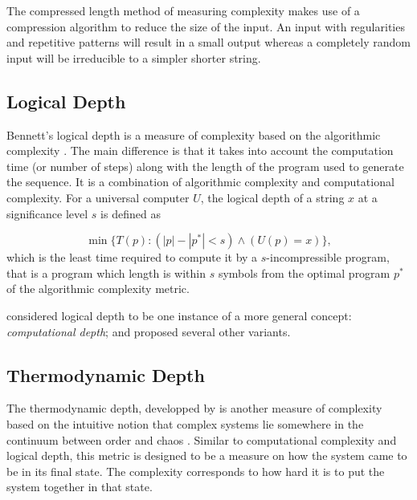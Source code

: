 The compressed length method of measuring complexity makes use of a compression
algorithm to reduce the size of the input. An input with regularities and
repetitive patterns will result in a small output whereas a completely random
input will be irreducible to a simpler shorter string.


\subsection{Logical Depth}

Bennett's logical depth is a measure of complexity based on the algorithmic
complexity \parencite{bennettDissipationInformationComputational1988,
  bennettLogicalDepthPhysical1995}. The main difference is that it takes into
account the computation time (or number of steps) along with the length of the
program used to generate the sequence. It is a combination of algorithmic
complexity and computational complexity. For a universal computer $U$, the
logical depth of a string $x$ at a significance level $s$ is defined as

\begin{equation}
  \label{eq:2}
  \min\{T(p): (|p| - |p^{*}| < s ) \wedge (U(p) = x) \},
\end{equation}
which is the least time required to compute it by a $s$-incompressible program,
that is a program which length is within $s$ symbols from the optimal program
$p^{*}$ of the algorithmic complexity metric.
\textcite{gutowitzCellularAutomataSciences1995}

\textcite{antunesComputationalDepthConcept2006} considered logical depth to be
one instance of a more general concept: \emph{computational depth}; and proposed
several other variants.

\subsection{Thermodynamic Depth}

The thermodynamic depth, developped by
\textcite{lloydComplexityThermodynamicDepth1988} is another measure of
complexity based on the intuitive notion that complex systems lie somewhere in
the continuum between order and chaos
\parencite{chaitinInformationRandomnessIncompleteness1990,
  ceccattoComplexityHierarchicalSystems1988, deutschQuantumTheoryChurch1985}.
Similar to computational complexity and logical depth, this metric is designed
to be a measure on how the system came to be in its final state. The complexity
corresponds to how hard it is to put the system together in that state.

